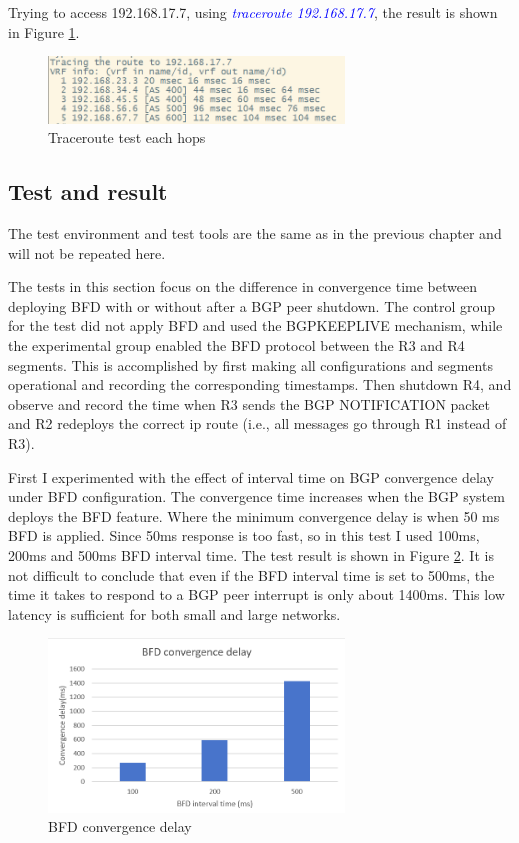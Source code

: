 \documentclass[12pt]{article}
\begin{document}
Trying to access 192.168.17.7, using \textcolor{blue}{\textit{traceroute 192.168.17.7}}, the result is shown in Figure \ref{fig:Traceroute test each hops}.

\begin{figure}[h]
    \centering
    \includegraphics[width=0.7\textwidth,keepaspectratio]{Graph/traceroute.png}
    \caption{Traceroute test each hops} 
    \label{fig:Traceroute test each hops} 
\end{figure}

\subsection{Test and result}
The test environment and test tools are the same as in the previous chapter and will not be repeated here.

The tests in this section focus on the difference in convergence time between deploying BFD with or without  after a BGP peer shutdown. The control group for the test did not apply BFD and used the BGPKEEPLIVE mechanism, while the experimental group enabled the BFD protocol between the R3 and R4 segments. This is accomplished by first making all configurations and segments operational and recording the corresponding timestamps. Then shutdown R4, and observe and record the time when R3 sends the BGP NOTIFICATION packet and R2 redeploys the correct ip route (i.e., all messages go through R1 instead of R3).

First I experimented with the effect of interval time on BGP convergence delay under BFD configuration. The convergence time increases when the BGP system deploys the BFD feature. Where the minimum convergence delay is when 50 ms BFD is applied\cite{ref2}. Since 50ms response is too fast, so in this test I used 100ms, 200ms and 500ms BFD interval time. The test result is shown in Figure \ref{fig:BFD convergence delay}. It is not difficult to conclude that even if the BFD interval time is set to 500ms, the time it takes to respond to a BGP peer interrupt is only about 1400ms. This low latency is sufficient for both small and large networks.

\begin{figure}[h]
    \centering
    \includegraphics[width=0.7\textwidth,keepaspectratio]{Graph/BFD convergence delay.png}
    \caption{BFD convergence delay} 
    \label{fig:BFD convergence delay} 
\end{figure}
\end{document}
